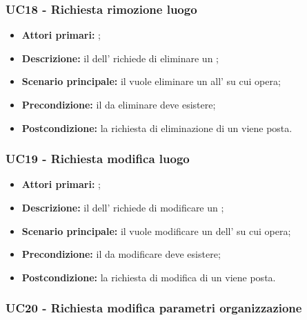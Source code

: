 \documentclass[../analisi-dei-requisiti]{subfiles}
\begin{document}
\subsubsection{UC18 - Richiesta rimozione luogo}
\label{subsub:UC18}

\begin{itemize}
\item \textbf{Attori primari:} ;
\item \textbf{Descrizione:} il  dell' richiede di eliminare un ;
\item \textbf{Scenario principale:} il  vuole eliminare un  all' su cui opera;
\item \textbf{Precondizione:} il  da eliminare deve esistere;
\item \textbf{Postcondizione:} la richiesta di eliminazione di un  viene posta.

\end{itemize}

\subsubsection{UC19 - Richiesta modifica luogo}
\label{subsub:UC19}

\begin{itemize}
\item \textbf{Attori primari:} ;
\item \textbf{Descrizione:} il  dell' richiede di modificare un ;
\item \textbf{Scenario principale:} il  vuole modificare un  dell' su cui opera;
\item \textbf{Precondizione:} il  da modificare deve esistere;
\item \textbf{Postcondizione:} la richiesta di modifica di un  viene posta.

\end{itemize}


\subsubsection{UC20 - Richiesta modifica parametri organizzazione}
\label{subsub:UC20}
\end{document}
